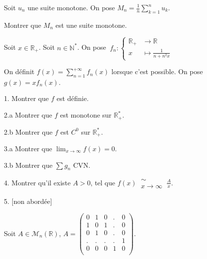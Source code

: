 \subetoiles



\noindent Soit $u_n$ une suite monotone.
On pose $\displaystyle M_n = \frac {1} {n} \sum_{k = 1}^{n} u_k$.

\vspace{5pt}
\noindent Montrer que $M_n$ est une suite monotone.



\subetoiles
\columnbreak



\noindent Soit $x \in \mathbb{R}_+$. Soit $n \in \mathbb{N}^*$.
\noindent On pose
$\ f_n :
\begin{cases}
  \mathbb{R}_+  & \longrightarrow \mathbb{R}\\    
  x & \longmapsto \displaystyle \frac {1} {n + n^2x}
\end{cases}
$

\noindent On définit $\displaystyle f(x) = \sum_{n=1}^{+\infty}f_n(x)$ lorsque c'est possible.
\noindent On pose $g(x) = xf_n(x)$.

\vspace{5pt}
1. Montrer que $f$ est définie.

\vspace{5pt}
2.a Montrer que $f$ est monotone sur $\mathbb{R}_+^*$.

\vspace{5pt}
2.b Montrer que $f$ est $C^0$ sur $\mathbb{R}_+^*$.

\vspace{5pt}
3.a Montrer que $\displaystyle \lim_{x\to\infty} f(x) = 0$.

\vspace{5pt}
3.b Montrer que $\sum g_n$ CVN.

\vspace{5pt}
4. Montrer qu'il existe $A > 0$, tel que $\displaystyle f(x) \ \substack{\sim \\ x\to\infty} \ \frac {A} {x}$.

\vspace{5pt}
5. [non abordée]



\subetoiles



\noindent Soit $A \in \mathcal{M}_n(\mathbb{R})$, $A =
\begin{pmatrix}
0 & 1 & 0 & . & 0 \\
1 & 0 & 1 & . & 0 \\
0 & 1 & 0 & . & 0 \\
. & . & . & . & 1 \\
0 & 0 & 0 & 1 & 0 \\
\end{pmatrix}
$.


